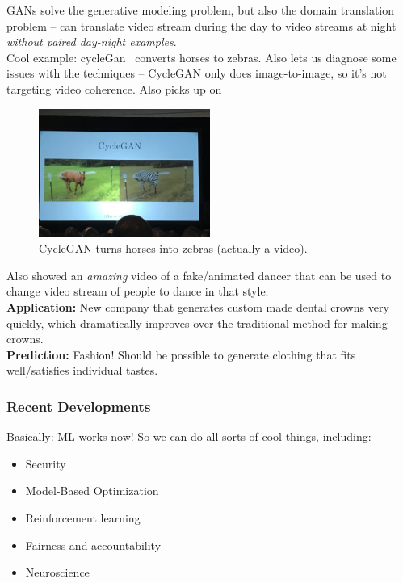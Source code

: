 GANs solve the generative modeling problem, but also the domain translation problem -- can translate video stream during the day to video streams at night {\it without paired day-night examples}. \\

Cool example: cycleGan~\cite{zhu2017unpaired} converts horses to zebras. Also lets us diagnose some issues with the techniques -- CycleGAN only does image-to-image, so it's not targeting video coherence. Also picks up on 


\begin{figure}[h!]
    \centering
    \includegraphics[width=0.5\textwidth]{images/zebra.JPG}
    \caption{CycleGAN turns horses into zebras (actually a video).}
    \label{fig:zebra}
\end{figure}

Also showed an {\it amazing} video of a fake/animated dancer that can be used to change video stream of people to dance in that style. \\

{\bf Application:} New company that generates custom made dental crowns very quickly, which dramatically improves over the traditional method for making crowns. \\

{\bf Prediction:} Fashion! Should be possible to generate clothing that fits well/satisfies individual tastes. \\

\subsubsection{Recent Developments}

Basically: ML works now! So we can do all sorts of cool things, including:
\begin{itemize}
    \item Security
    \item Model-Based Optimization
    \item Reinforcement learning
    \item Fairness and accountability
    \item Neuroscience
\end{itemize}


